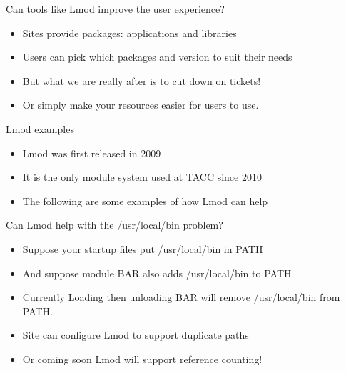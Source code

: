 \documentclass{beamer}
\begin{document}
\begin{frame}{Can tools like Lmod improve the user experience?}
  \begin{itemize}
    \item Sites provide packages: applications and libraries
    \item Users can pick which packages and version to suit their needs
    \item But what we are really after is to cut down on tickets!
    \item Or simply make your resources easier for users to use.
  \end{itemize}
\end{frame}

\begin{frame}{Lmod examples}
  \begin{itemize}
    \item Lmod was first released in 2009
    \item It is the only module system used at TACC since 2010
    \item The following are some examples of how Lmod can help
  \end{itemize}
\end{frame}

\begin{frame}{Can Lmod help with the /usr/local/bin problem?}
  \begin{itemize}
    \item Suppose your startup files put /usr/local/bin in PATH
    \item And suppose module BAR also adds /usr/local/bin to PATH
    \item Currently Loading then unloading BAR will remove
      /usr/local/bin from PATH. 
    \item Site can configure Lmod to support duplicate paths
    \item Or coming soon Lmod will support reference counting!
  \end{itemize}
\end{frame}
\end{document}
